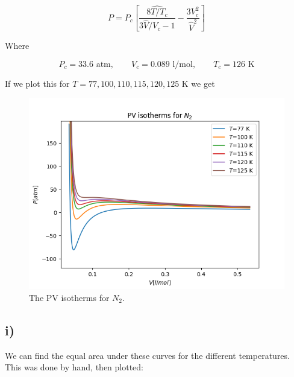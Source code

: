 \documentclass[a4paper,norsk, 10pt]{article}
\begin{document}
\begin{equation}
P = P_c\left[\frac{\hat{8T/T_c}}{3\hat{V}/V_c - 1} - \frac{3V_c^2}{\hat{V}^2}\right]
\end{equation}

Where

\begin{equation}
P_c = 33.6 \text{ atm}, \qquad V_c = 0.089 \text{ l/mol}, \qquad T_c = 126 \text{ K}
\end{equation}

If we plot this for $T = 77,100,110,115,120,125$ K we get

\begin{figure}[H]
\centering
\includegraphics[scale=0.5]{isoTherm.png}
\caption{The PV isotherms for $N_2$.}
\label{fig:isoTherm}
\end{figure}

\subsection{i)}
We can find the equal area under these curves for the different temperatures. This was done by hand, then plotted:
\end{document}
